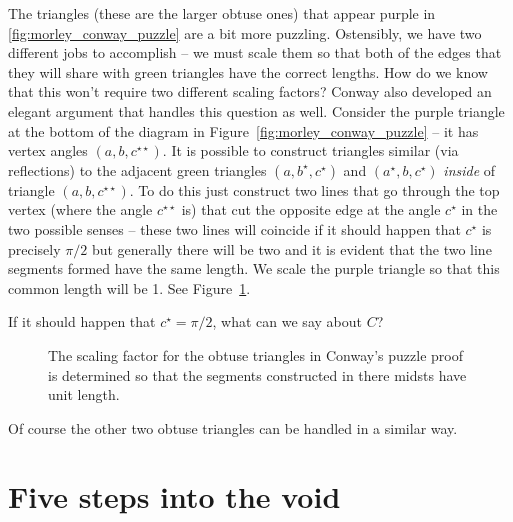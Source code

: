 The triangles (these are the larger obtuse ones) that appear purple in \ref{fig:morley_conway_puzzle} are 
a bit more puzzling.  Ostensibly, we have two different jobs to accomplish --
we must scale them so that both of the edges that they will share
with green triangles have the correct lengths.  How do we know
that this won't require two different scaling factors?  Conway also
developed an elegant argument that handles this question as well.
Consider the purple triangle at the bottom of the 
diagram in Figure~\ref{fig:morley_conway_puzzle} -- it has vertex
angles $(a,b,c^{\star\star})$.  It is possible to construct triangles
similar (via reflections) to the adjacent green triangles 
$(a, b^\star, c^\star)$ and $(a^\star, b, c^\star)$ \emph{inside} of
triangle $(a,b,c^{\star\star})$.  To do this just construct two lines that
go through the top vertex (where the angle $c^{\star\star}$ is) that cut
the opposite edge at the angle $c^\star$ in the two possible senses -- 
these two lines
will coincide if it should happen that $c^\star$ is precisely $\pi/2$
but generally there will be two and it is evident that the two line
segments formed have the same length.  We scale the purple triangle so
that this common length will be 1.  See Figure~\ref{fig:morley_conway_puzzle_scaling}.

\begin{exer}
If it should happen that $c^\star = \pi/2$, what can we 
say about $C$?
\end{exer}

\begin{figure}[!hbtp] 
\begin{center}

\end{center}
\caption[Scaling in Conway's puzzle proof.]{The scaling factor for
the obtuse triangles in Conway's puzzle proof is determined so that 
the segments constructed in there midsts have unit length.}
\label{fig:morley_conway_puzzle_scaling}
\end{figure}
 
Of course the other two obtuse triangles can be handled in a similar way.

\clearpage




\newpage

\section{Five steps into the void}
\label{sec:5_steps}

